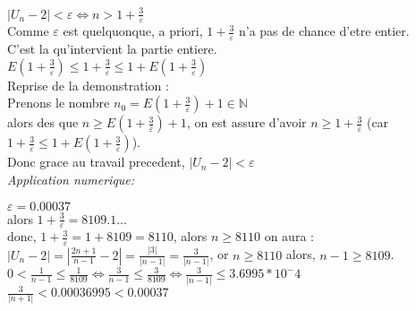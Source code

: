 \documentclass[a4paper,10pt]{book}
\begin{document}
				$|U_n - 2| < \varepsilon \Leftrightarrow n > 1 + \frac{3}{\varepsilon}$\\

				Comme $\varepsilon$ est quelquonque, a priori, $1+\frac{3}{\varepsilon}$ n'a pas de chance d'etre entier.\\
				C'est la qu'intervient la partie entiere.\\

				$E(1 + \frac{3}{\varepsilon}) \leq 1 + \frac{3}{\varepsilon} \leq 1 + E(1 + \frac{3}{\varepsilon})$\\

				Reprise de la demonstration :\\

				Prenons le nombre $n_0 = E(1 + \frac{3}{\varepsilon}) + 1 \in \mathbb{N}$\\
				alors des que $n \geq E(1 + \frac{3}{\varepsilon}) + 1$, on est assure d'avoir $n \geq 1 + \frac{3}{\varepsilon}$ (car $1 + \frac{3}{\varepsilon} \leq 1 + E(1 + \frac{3}{\varepsilon})$).\\
				Donc grace au travail precedent, $|U_n - 2| < \varepsilon$\\

				\textit{Application numerique:\\}

				$\varepsilon = 0.00037$\\
				alors $1 + \frac{3}{\varepsilon} = 8109.1...$\\
				donc, $1 + \frac{3}{\varepsilon} = 1+ 8109 = 8110$, alors $n \geq 8110$ on aura : $|U_n - 2| = |\frac{2n+1}{n-1} - 2| = \frac{|3|}{|n-1|} = \frac{3}{|n-1|}$, or $n \geq 8110$ alors, $n-1 \geq 8109$.\\
				$0 < \frac{1}{n-1} \leq \frac{1}{8109} \Leftrightarrow \frac{3}{n-1} \leq \frac{3}{8109} \Leftrightarrow \frac{3}{|n-1|} \leq 3.6995 * 10^-4$\\
				$\frac{3}{|n+1|} < 0.00036995 < 0.00037$

	
\end{document}
